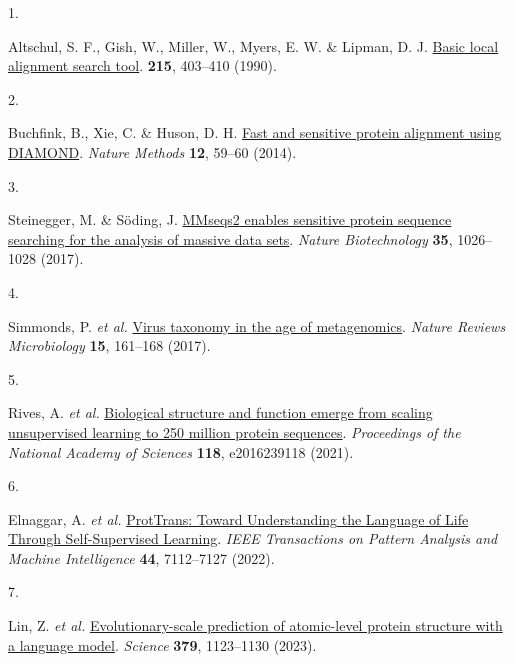 \documentclass[
  sn-nature,
]{sn-jnl}
\newlength{\cslhangindent}
\newlength{\csllabelwidth}
\newenvironment{CSLReferences}[2] %
 {\begin{list}{}{%
  \setlength{\itemindent}{0pt}
  \setlength{\leftmargin}{0pt}
  \setlength{\parsep}{0pt}
  \ifodd #1
   \setlength{\leftmargin}{\cslhangindent}
   \setlength{\itemindent}{-1\cslhangindent}
  \fi
  \setlength{\itemsep}{#2\baselineskip}}}
 {\end{list}}
\newcommand{\CSLLeftMargin}[1]{\parbox[t]{\csllabelwidth}{\strut#1\strut}}
\newcommand{\CSLRightInline}[1]{\parbox[t]{\linewidth - \csllabelwidth}{\strut#1\strut}}
\begin{document}
\protect{}\label{refs}
\begin{CSLReferences}{0}{0}
\CSLLeftMargin{1. }%
\CSLRightInline{Altschul, S. F., Gish, W., Miller, W., Myers, E. W. \&
Lipman, D. J. \href{https://doi.org/10.1016/S0022-2836(05)80360-2}{Basic
local alignment search tool}. \textbf{215}, 403--410 (1990).}

\CSLLeftMargin{2. }%
\CSLRightInline{Buchfink, B., Xie, C. \& Huson, D. H.
\href{https://doi.org/10.1038/nmeth.3176}{Fast and sensitive protein
alignment using {DIAMOND}}. \emph{Nature Methods} \textbf{12}, 59--60
(2014).}

\CSLLeftMargin{3. }%
\CSLRightInline{Steinegger, M. \& Söding, J.
\href{https://doi.org/10.1038/nbt.3988}{{MMseqs2} enables sensitive
protein sequence searching for the analysis of massive data sets}.
\emph{Nature Biotechnology} \textbf{35}, 1026--1028 (2017).}

\CSLLeftMargin{4. }%
\CSLRightInline{{Simmonds, P. \emph{et al.}}
\href{https://doi.org/10.1038/nrmicro.2016.177}{Virus taxonomy in the
age of metagenomics}. \emph{Nature Reviews Microbiology} \textbf{15},
161--168 (2017).}

\CSLLeftMargin{5. }%
\CSLRightInline{Rives, A. \emph{et al.}
\href{https://doi.org/10.1073/pnas.2016239118}{Biological structure and
function emerge from scaling unsupervised learning to 250 million
protein sequences}. \emph{Proceedings of the National Academy of
Sciences} \textbf{118}, e2016239118 (2021).}

\CSLLeftMargin{6. }%
\CSLRightInline{Elnaggar, A. \emph{et al.}
\href{https://doi.org/10.1109/TPAMI.2021.3095381}{{ProtTrans}: {Toward
Understanding} the {Language} of {Life Through Self-Supervised
Learning}}. \emph{IEEE Transactions on Pattern Analysis and Machine
Intelligence} \textbf{44}, 7112--7127 (2022).}

\CSLLeftMargin{7. }%
\CSLRightInline{{Lin, Z. \emph{et al.}}
\href{https://doi.org/10.1126/science.ade2574}{Evolutionary-scale
prediction of atomic-level protein structure with a language model}.
\emph{Science} \textbf{379}, 1123--1130 (2023).}


\end{CSLReferences}
\end{document}
